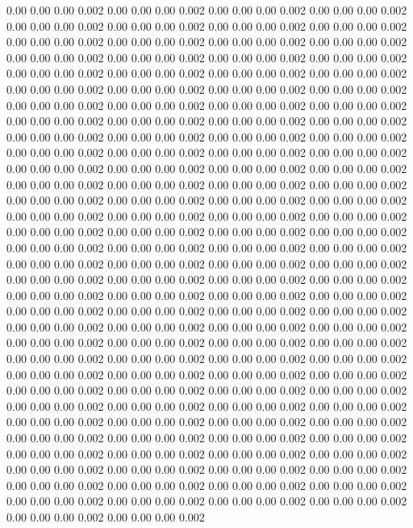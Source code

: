 0.00 0.00 0.00 0.002
0.00 0.00 0.00 0.002
0.00 0.00 0.00 0.002
0.00 0.00 0.00 0.002
0.00 0.00 0.00 0.002
0.00 0.00 0.00 0.002
0.00 0.00 0.00 0.002
0.00 0.00 0.00 0.002
0.00 0.00 0.00 0.002
0.00 0.00 0.00 0.002
0.00 0.00 0.00 0.002
0.00 0.00 0.00 0.002
0.00 0.00 0.00 0.002
0.00 0.00 0.00 0.002
0.00 0.00 0.00 0.002
0.00 0.00 0.00 0.002
0.00 0.00 0.00 0.002
0.00 0.00 0.00 0.002
0.00 0.00 0.00 0.002
0.00 0.00 0.00 0.002
0.00 0.00 0.00 0.002
0.00 0.00 0.00 0.002
0.00 0.00 0.00 0.002
0.00 0.00 0.00 0.002
0.00 0.00 0.00 0.002
0.00 0.00 0.00 0.002
0.00 0.00 0.00 0.002
0.00 0.00 0.00 0.002
0.00 0.00 0.00 0.002
0.00 0.00 0.00 0.002
0.00 0.00 0.00 0.002
0.00 0.00 0.00 0.002
0.00 0.00 0.00 0.002
0.00 0.00 0.00 0.002
0.00 0.00 0.00 0.002
0.00 0.00 0.00 0.002
0.00 0.00 0.00 0.002
0.00 0.00 0.00 0.002
0.00 0.00 0.00 0.002
0.00 0.00 0.00 0.002
0.00 0.00 0.00 0.002
0.00 0.00 0.00 0.002
0.00 0.00 0.00 0.002
0.00 0.00 0.00 0.002
0.00 0.00 0.00 0.002
0.00 0.00 0.00 0.002
0.00 0.00 0.00 0.002
0.00 0.00 0.00 0.002
0.00 0.00 0.00 0.002
0.00 0.00 0.00 0.002
0.00 0.00 0.00 0.002
0.00 0.00 0.00 0.002
0.00 0.00 0.00 0.002
0.00 0.00 0.00 0.002
0.00 0.00 0.00 0.002
0.00 0.00 0.00 0.002
0.00 0.00 0.00 0.002
0.00 0.00 0.00 0.002
0.00 0.00 0.00 0.002
0.00 0.00 0.00 0.002
0.00 0.00 0.00 0.002
0.00 0.00 0.00 0.002
0.00 0.00 0.00 0.002
0.00 0.00 0.00 0.002
0.00 0.00 0.00 0.002
0.00 0.00 0.00 0.002
0.00 0.00 0.00 0.002
0.00 0.00 0.00 0.002
0.00 0.00 0.00 0.002
0.00 0.00 0.00 0.002
0.00 0.00 0.00 0.002
0.00 0.00 0.00 0.002
0.00 0.00 0.00 0.002
0.00 0.00 0.00 0.002
0.00 0.00 0.00 0.002
0.00 0.00 0.00 0.002
0.00 0.00 0.00 0.002
0.00 0.00 0.00 0.002
0.00 0.00 0.00 0.002
0.00 0.00 0.00 0.002
0.00 0.00 0.00 0.002
0.00 0.00 0.00 0.002
0.00 0.00 0.00 0.002
0.00 0.00 0.00 0.002
0.00 0.00 0.00 0.002
0.00 0.00 0.00 0.002
0.00 0.00 0.00 0.002
0.00 0.00 0.00 0.002
0.00 0.00 0.00 0.002
0.00 0.00 0.00 0.002
0.00 0.00 0.00 0.002
0.00 0.00 0.00 0.002
0.00 0.00 0.00 0.002
0.00 0.00 0.00 0.002
0.00 0.00 0.00 0.002
0.00 0.00 0.00 0.002
0.00 0.00 0.00 0.002
0.00 0.00 0.00 0.002
0.00 0.00 0.00 0.002
0.00 0.00 0.00 0.002
0.00 0.00 0.00 0.002
0.00 0.00 0.00 0.002
0.00 0.00 0.00 0.002
0.00 0.00 0.00 0.002
0.00 0.00 0.00 0.002
0.00 0.00 0.00 0.002
0.00 0.00 0.00 0.002
0.00 0.00 0.00 0.002
0.00 0.00 0.00 0.002
0.00 0.00 0.00 0.002
0.00 0.00 0.00 0.002
0.00 0.00 0.00 0.002
0.00 0.00 0.00 0.002
0.00 0.00 0.00 0.002
0.00 0.00 0.00 0.002
0.00 0.00 0.00 0.002
0.00 0.00 0.00 0.002
0.00 0.00 0.00 0.002
0.00 0.00 0.00 0.002
0.00 0.00 0.00 0.002
0.00 0.00 0.00 0.002
0.00 0.00 0.00 0.002
0.00 0.00 0.00 0.002
0.00 0.00 0.00 0.002
0.00 0.00 0.00 0.002
0.00 0.00 0.00 0.002
0.00 0.00 0.00 0.002
0.00 0.00 0.00 0.002
0.00 0.00 0.00 0.002
0.00 0.00 0.00 0.002
